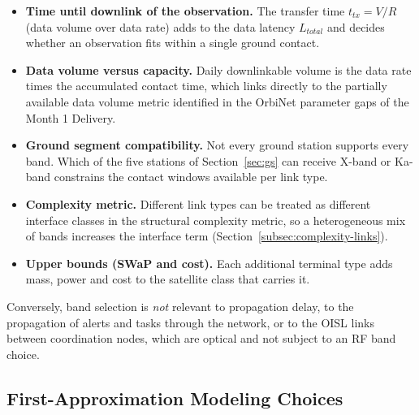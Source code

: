 \documentclass[11pt]{article}
\begin{document}
\begin{itemize}
    \item \textbf{Time until downlink of the observation.} The transfer time $t_{tx} = V / R$ (data volume over data rate) adds to the data latency $L_{total}$ and decides whether an observation fits within a single ground contact.
    \item \textbf{Data volume versus capacity.} Daily downlinkable volume is the data rate times the accumulated contact time, which links directly to the partially available data volume metric identified in the OrbiNet parameter gaps of the Month 1 Delivery.
    \item \textbf{Ground segment compatibility.} Not every ground station supports every band. Which of the five stations of Section~\ref{sec:gs} can receive X-band or Ka-band constrains the contact windows available per link type.
    \item \textbf{Complexity metric.} Different link types can be treated as different interface classes in the structural complexity metric, so a heterogeneous mix of bands increases the interface term (Section~\ref{subsec:complexity-links}).
    \item \textbf{Upper bounds (SWaP and cost).} Each additional terminal type adds mass, power and cost to the satellite class that carries it.
\end{itemize}

Conversely, band selection is \emph{not} relevant to propagation delay, to the propagation of alerts and tasks through the network, or to the OISL links between coordination nodes, which are optical and not subject to an RF band choice.

\subsection{First-Approximation Modeling Choices}
\label{subsec:bandmodeling}
\end{document}
